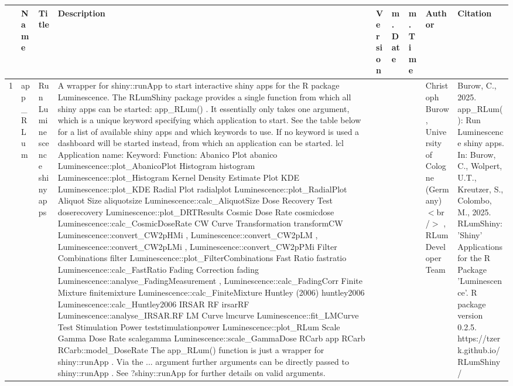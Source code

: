 \begin{table}[ht]
\centering
\begin{tabular}{rllllllll}
  \hline
 & Name & Title & Description & Version & m.Date & m.Time & Author & Citation \\ 
  \hline
1 & app\_RLum & Run Luminescence shiny apps & A wrapper for  shiny::runApp  to start interactive shiny apps for the R package Luminescence.  The RLumShiny package provides a single function from which all shiny apps can be started:  app\_RLum() . It essentially only takes one argument, which is a unique keyword specifying which application to start. See the table below for a list of available shiny apps and which keywords to use. If no keyword is used a dashboard will be started instead, from which an application can be started.  lcl  Application name:      Keyword:      Function:    Abanico Plot    abanico     Luminescence::plot\_AbanicoPlot    Histogram    histogram     Luminescence::plot\_Histogram    Kernel Density Estimate Plot    KDE     Luminescence::plot\_KDE    Radial Plot    radialplot     Luminescence::plot\_RadialPlot    Aliquot Size    aliquotsize     Luminescence::calc\_AliquotSize    Dose Recovery Test    doserecovery     Luminescence::plot\_DRTResults    Cosmic Dose Rate    cosmicdose      Luminescence::calc\_CosmicDoseRate    CW Curve Transformation    transformCW     Luminescence::convert\_CW2pHMi ,  Luminescence::convert\_CW2pLM ,  Luminescence::convert\_CW2pLMi ,  Luminescence::convert\_CW2pPMi    Filter Combinations    filter     Luminescence::plot\_FilterCombinations    Fast Ratio    fastratio     Luminescence::calc\_FastRatio    Fading Correction    fading     Luminescence::analyse\_FadingMeasurement ,  Luminescence::calc\_FadingCorr    Finite Mixture    finitemixture     Luminescence::calc\_FiniteMixture    Huntley (2006)    huntley2006     Luminescence::calc\_Huntley2006    IRSAR RF    irsarRF     Luminescence::analyse\_IRSAR.RF    LM Curve    lmcurve     Luminescence::fit\_LMCurve    Test Stimulation Power    teststimulationpower      Luminescence::plot\_RLum    Scale Gamma Dose Rate    scalegamma     Luminescence::scale\_GammaDose    RCarb app    RCarb     RCarb::model\_DoseRate    The  app\_RLum()  function is just a wrapper for  shiny::runApp . Via the  ...  argument further arguments can be directly passed to  shiny::runApp . See  ?shiny::runApp  for further details on valid arguments. &  &  &  & Christoph Burow, University of Cologne (Germany)$<$br /$>$ , RLum Developer Team & Burow, C., 2025. app\_RLum(): Run Luminescence shiny apps. In: Burow, C., Wolpert, U.T., Kreutzer, S., Colombo, M., 2025. RLumShiny: 'Shiny' Applications for the R Package 'Luminescence'. R package version 0.2.5. https://tzerk.github.io/RLumShiny/

\end{tabular}
\end{table}
